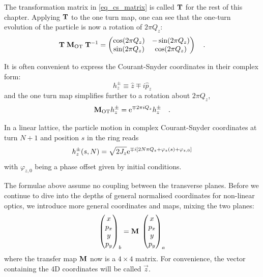 The transformation matrix in \eqref{eq_cs_matrix} is called $\mathbf{T}$ for the rest of this chapter.
Applying $\mathbf{T}$ to the one turn map, one can see that the one-turn evolution of the particle is
now a rotation of $2\pi Q_z$:
\begin{equation}
    \mathbf{T}\;\mathbf{M}_\text{OT}\;\mathbf{T}^{-1} = 
    \begin{pmatrix}
        \cos(2\pi Q_z) & -\sin(2\pi Q_z)\\
        \sin(2\pi Q_z) & \cos(2\pi Q_z) \\
    \end{pmatrix}
    \quad .
\end{equation}

It is often convenient to express the Courant-Snyder coordinates in their complex form:
%
\begin{equation}
    h^\pm_z \equiv \hat{z} \mp i \hat{p}_z
    \label{eq_courantsnyder}
\end{equation}
%
and the one turn map simplifies further to a rotation about $2\pi Q_z$, 
%
\begin{equation}
  \mathbf{M}_{\text{OT}} h_z^\pm = \text{e}^{\mp 2\pi i Q_z}h_z^\pm
  \quad .
\end{equation}

In a linear lattice, the particle motion in complex Courant-Snyder coordinates at turn $N+1$ and position
$s$ in the ring reads
%
\begin{equation}
    h_z^\pm(s,N) = \sqrt{2J_z} \text{e}^{\mp i \left[2N\pi Q_z + \varphi_z(s) + \varphi_{z,0}\right]}
\end{equation}
%
with $\varphi_{z,0}$ being a phase offset given by initial conditions.

The formulae above assume no coupling between the transverse planes.
Before we continue to dive into the depths of general normalised coordinates for non-linear
optics, we introduce more general coordinates and maps, mixing the two planes:
\begin{equation}
    \begin{pmatrix}
        x \\ p_x \\ y \\ p_y
    \end{pmatrix}_b
    =
    \mathbf{M}\;
    \begin{pmatrix}
        x \\ p_x \\ y \\ p_y
    \end{pmatrix}_a
\end{equation}
where the transfer map $\mathbf{M}$ now is a $4\times 4$ matrix.
For convenience, the vector containing the 4D coordinates will be called $\vec{z}$.

